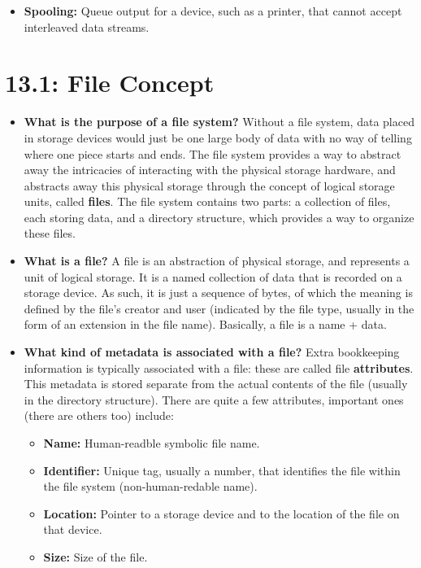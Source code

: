\documentclass[12pt]{article}
\begin{document}
\begin{itemize}
    \item \textbf{Spooling:} Queue output for a device, such as a printer, that cannot accept interleaved data streams.
\end{itemize}

\section*{13.1: File Concept}

\begin{itemize}
    \item \textbf{What is the purpose of a file system?} Without a file system, data placed in storage devices would just be one large body of data with no way of telling where one piece starts and ends. The file system provides a way to abstract away the intricacies of interacting with the physical storage hardware, and abstracts away this physical storage through the concept of logical storage units, called \textbf{files}. The file system contains two parts: a collection of files, each storing data, and a directory structure, which provides a way to organize these files.
    \item \textbf{What is a file?} A file is an abstraction of physical storage, and represents a unit of logical storage. It is a named collection of data that is recorded on a storage device. As such, it is just a sequence of bytes, of which the meaning is defined by the file's creator and user (indicated by the file type, usually in the form of an extension in the file name). Basically, a file is a name + data.
    \item \textbf{What kind of metadata is associated with a file?} Extra bookkeeping information is typically associated with a file: these are called file \textbf{attributes}. This metadata is stored separate from the actual contents of the file (usually in the directory structure). There are quite a few attributes, important ones (there are others too) include:
        \begin{itemize}
            \item \textbf{Name:} Human-readble symbolic file name.
            \item \textbf{Identifier:} Unique tag, usually a number, that identifies the file within the file system (non-human-redable name).
            \item \textbf{Location:} Pointer to a storage device and to the location of the file on that device.
            \item \textbf{Size:} Size of the file.

\end{itemize}
\end{itemize}
\end{document}
